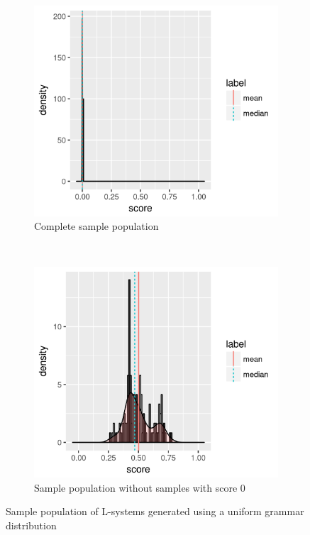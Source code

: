 \begin{figure}
    \centering
    \begin{subfigure}{0.48\textwidth}
        \includegraphics[width=\textwidth]{figures/uniform-population}
        \caption{Complete sample population}
        \label{fig:uniform-population}
    \end{subfigure}
    ~
    \begin{subfigure}{0.48\textwidth}
        \includegraphics[width=\textwidth]{figures/uniform-population-no0}
        \caption{Sample population without samples with score 0}
        \label{fig:uniform-population-no0}
    \end{subfigure}
    \caption{Sample population of L-systems generated using a uniform grammar distribution}
\end{figure}


